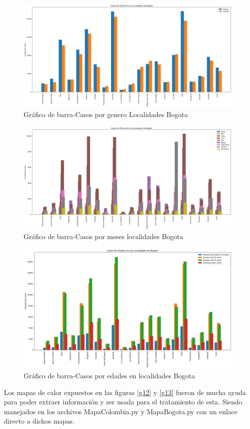 \documentclass[conference,compsoc,onecolumn]{IEEEtran}
\begin{document}
\begin{figure}[H]
    \centering
    \includegraphics[scale=0.3]{PicturesUpdate/GraficaBarras_Genero_Covid_Localidad_Bogota_02-11-20.png}
    \caption{Gráfico de barra-Casos por genero Localidades Bogota}
    \label{g9}
\end{figure}

\begin{figure}[H]
    \centering
    \includegraphics[scale=0.3]{PicturesUpdate/GraficaBarras_Mes_Covid_Localidad_Bogota_02-11-20.png}
    \caption{Gráfico de barra-Casos por meses localidades Bogota}
    \label{g10}
\end{figure}


\begin{figure}[H]
    \centering
    \includegraphics[scale=0.3]{PicturesUpdate/GraficaBarras_Edad_Covid_Bogota_02-11-20.png}
    \caption{Gráfico de barra-Casos por edades en localidades Bogota}
    \label{g11}
\end{figure}
\clearpage
Los mapas de calor expuestos en las figuras \ref{g12} y \ref{g13} fueron de mucha ayuda para poder extraer información y ser usada para el tratamiento de esta. Siendo manejados en los archivos MapaColombia.py y MapaBogota.py con un enlace directo a dichos mapas.
\end{document}
